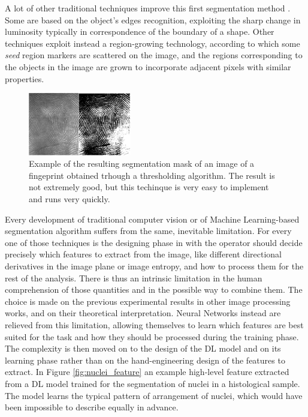 A lot of other traditional techniques improve this first segmentation method \cite{Chouhan2018}. Some are based on the object's edges recognition, exploiting the sharp change in luminosity typically in correspondence of the boundary of a shape. Other techniques exploit instead a region-growing technology, according to which some \textit{seed} region markers are scattered on the image, and the regions corresponding to the objects in the image are grown to incorporate adjacent pixels with similar properties.

\begin{figure}
    \centering
    \includegraphics[width = 0.4\textwidth]{images/fingerprints}
    \caption{Example of the resulting segmentation mask of an image of a fingeprint obtained trhough a thresholding algorithm. The result is not extremely good, but this techinque is very easy to implement and runs very quickly.}
    \label{fig:fing_prints}
\end{figure}

Every development of traditional computer vision or of Machine Learning-based segmentation algorithm suffers from the same, inevitable limitation. For every one of those techniques is the designing phase in with the operator should decide precisely which features to extract from the image, like different directional derivatives in the image plane or image entropy, and how to process them for the rest of the analysis. There is thus an intrinsic limitation in the human comprehension of those quantities and in the possible way to combine them. The choice is made on the previous experimental results in other image processing works, and on their theoretical interpretation. Neural Networks instead are relieved from this limitation, allowing themselves to learn which features are best suited for the task and how they should be processed during the training phase. The complexity is then moved on to the design of the DL model and on its learning phase rather than on the hand-engineering design of the features to extract. In Figure \ref{fig:nuclei_feature} an example high-level feature extracted from a DL model trained for the segmentation of nuclei in a histological sample. The model learns the typical pattern of arrangement of nuclei, which would have been impossible to describe equally in advance.

